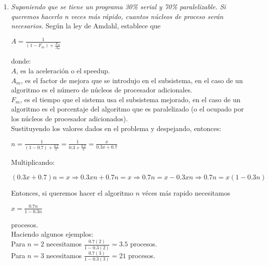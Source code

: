 \documentclass{article}
\begin{document}
\begin{enumerate}
\item{
    \textsl{
      Suponiendo que se tiene un programa 30\% serial y 70\%
      paralelizable. Si queremos hacerlo n veces más rápido, cuantos
      núcleos de proceso serán necesarios.
    }
  }
  Según la ley de Amdahl, establece que\\
  \begin{center}
  $A = \frac{1}{(1 - F_{m}) + \frac{F_{m}}{A_{m}}}$
  \end{center}
  donde:\\
  $A$, es la aceleración o el speedup.\\
  $A_{m}$, es el factor de mejora que se introdujo en el subsistema, en el caso de un
  algoritmo es el número de núcleos de procesador adicionales.\\
  $F_{m}$, es el tiempo que el sistema usa el subsistema mejorado, en el caso de un
  algoritmo es el porcentaje del algoritmo que es paralelizado (o el ocupado por los
  núcleos de procesador adicionados).\\
  Sustituyendo los valores dados en el problema y despejando, entonces:
  \begin{center}
  $n = \frac{1}{(1 - 0.7) + \frac{0.7}{x}} = \frac{1}{0.3 + \frac{0.7}{x}} = \frac{x}{0.3x + 0.7}$
  \end{center}
  Multiplicando:
  \begin{center}
  $(0.3x + 0.7)n = x \Rightarrow 0.3xn + 0.7n = x \Rightarrow 0.7n = x - 0.3xn \Rightarrow 0.7n = x(1 - 0.3n)$
  \end{center}
  Entonces, si queremos hacer el algoritmo $n$ véces más rapido necesitamos
  \begin{center}
  $x = \frac{0.7n}{1 - 0.3n}$
  \end{center}
  procesos.\\
  Haciendo algunos ejemplos:\\
  Para $n = 2$ necesitamos $\frac{0.7 (2)}{1 - 0.3 (2)} = 3.5$ procesos.\\
  Para $n = 3$ necesitamos $\frac{0.7 (3)}{1 - 0.3 (3)} = 21$ procesos.

\end{enumerate}
\end{document}
